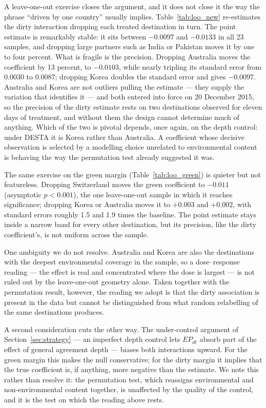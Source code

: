 \documentclass[12pt]{article}
\begin{document}
A leave-one-out exercise closes the argument, and it does not close it the way the phrase ``driven by
one country'' usually implies. Table~\ref{tab:loo_new} re-estimates the dirty interaction dropping
each treated destination in turn. The point estimate is remarkably stable: it sits between $-0.0097$
and $-0.0133$ in all 23 samples, and dropping large partners such as India or Pakistan moves it by
one to four percent. What is fragile is the precision. Dropping Australia moves the coefficient by 13
percent, to $-0.0103$, while nearly tripling its standard error from 0.0030 to 0.0087; dropping Korea
doubles the standard error and gives $-0.0097$. Australia and Korea are not outliers pulling the
estimate --- they supply the variation that identifies it --- and both entered into force on 20 December 2015, so the precision of the dirty estimate rests on two destinations observed for eleven days of treatment, and without them the design cannot
determine much of anything. Which of the two is pivotal depends, once again, on the depth control:
under DESTA it is Korea rather than Australia. A coefficient whose decisive observation is selected
by a modelling choice unrelated to environmental content is behaving the way the permutation test
already suggested it was.

The same exercise on the green margin (Table~\ref{tab:loo_green}) is quieter but not featureless.
Dropping Switzerland moves the green coefficient to $-0.011$ (asymptotic $p < 0.001$), the one
leave-one-out sample in which it reaches significance; dropping Korea or Australia moves it to
$+0.003$ and $+0.002$, with standard errors roughly 1.5 and 1.9 times the baseline. The point
estimate stays inside a narrow band for every other destination, but its precision, like the dirty
coefficient's, is not uniform across the sample.

One ambiguity we do not resolve. Australia and Korea are also the destinations with the deepest
environmental coverage in the sample, so a dose--response reading --- the effect is real and
concentrated where the dose is largest --- is not ruled out by the leave-one-out geometry alone.
Taken together with the permutation result, however, the reading we adopt is that the dirty
association is present in the data but cannot be distinguished from what random relabelling of the
same destinations produces.

A second consideration cuts the other way. The under-control argument of Section~\ref{sec:strategy}
--- an imperfect depth control lets $EP_{dt}$ absorb part of the effect of general agreement depth
--- biases both interactions upward. For the green margin this makes the null conservative; for the
dirty margin it implies that the true coefficient is, if anything, more negative than the estimate.
We note this rather than resolve it: the permutation test, which reassigns environmental and
non-environmental content together, is unaffected by the quality of the control, and it is the test
on which the reading above rests.
\end{document}
